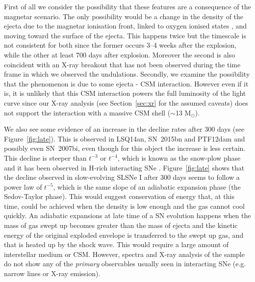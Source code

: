 \documentclass[useAMS,usenatbib]{mn2e}
\def\M{M$_{\odot}$}
\def\an{LSQ14an}
\begin{document}
First of all we consider the possibility that these features are a consequence of the magnetar scenario.
The only possibility would be a change in the density of the ejecta due to the magnetar ionisation front, linked to oxygen ionised states \citep[mainly O~{\sc ii} and O~{\sc iv},][]{me14}, and moving toward the surface of the ejecta. This happens twice but the timescale is not consistent for both since the former occurs 3--4 weeks after the explosion, while the other at least 700 days after explosion. Moreover the second is also coincident with an X-ray breakout that has not been observed during the time frame in which we observed the undulations.
Secondly, we examine the possibility that the phenomenon is due to some ejecta - CSM interaction. However even 
if it is, it is unlikely that this CSM interaction powers the full luminosity of the light curve since our X-ray analysis (see  Section~\ref{sec:xr} for the assumed caveats) does not support the interaction with a massive CSM shell ($\sim$13 \M).

We also see some evidence of an increase in the decline rates after 300 days (see Figure~\ref{fig:late}). This is observed in \an\/, SN~2015bn and PTF12dam and possibly even SN~2007bi, even though for this object the increase is less certain. This decline is steeper than $t^{-3}$ or $t^{-4}$, which is known as the snow-plow phase and it has been observed in H-rich interacting SNe \citep[e.g.][]{of14,fr14,in16a}. 
Figure~\ref{fig:late} shows that the decline observed in slow-evolving SLSNe I after 300 days seems to follow a power law of $t^{-5}$, which is the same slope of an adiabatic expansion phase (the Sedov-Taylor phase). This would suggest conservation of energy that, at this time, could be achieved when the density is low enough and the gas cannot cool quickly. An adiabatic expansions at late time of a SN evolution happens when the mass of gas swept up becomes greater than the mass of ejecta and the kinetic energy of the original exploded envelope is transferred to the swept up gas, and that is heated up by the shock wave. This would require a large amount of interstellar medium or CSM. However, spectra and X-ray analysis of the sample do not show any of the {\it primary} observables usually seen in interacting SNe (e.g. narrow lines or X-ray emission).
\end{document}
